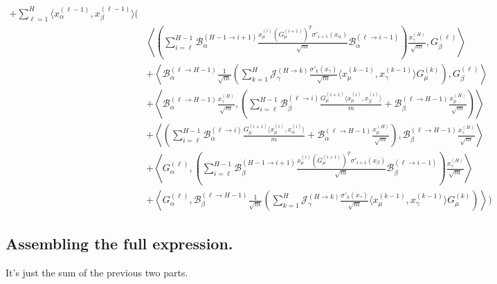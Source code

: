 \documentclass[11pt,a4paper]{article}
\theoremstyle{definition}
\begin{document}
\begin{align}
    + \sum_{\ell=1}^{H} \langle x^{(\ell-1)}_\alpha, x^{(\ell-1)}_\beta \rangle \Biggl( & \nonumber \\
    & \left\langle \left( \sum_{i=\ell}^{H-1} \mathcal{B}^{(H-1 \to i+1)}_\alpha \frac{x^{(i)}_\mu (G^{(i+1)}_\mu)^T \sigma'_{i+1}(x_\alpha)}{\sqrt{m}} \mathcal{B}^{(\ell \to i-1)}_\alpha \right) \frac{x^{(H)}_\gamma}{\sqrt{m}}, G^{(\ell)}_\beta \right\rangle \nonumber \\
    & + \left\langle \mathcal{B}^{(\ell \to H-1)}_{\alpha} \frac{1}{\sqrt{m}}\left( \sum_{k=1}^{H} \mathcal{J}^{(H \to k)}_{\gamma} \frac{\sigma'_{k}(x_\gamma)}{\sqrt{m}} \langle x^{(k-1)}_\mu, x^{(k-1)}_\gamma \rangle G^{(k)}_\mu \right), G^{(\ell)}_\beta \right\rangle \nonumber \\
    & + \left\langle \mathcal{B}^{(\ell \to H-1)}_{\alpha} \frac{x^{(H)}_\gamma}{\sqrt{m}}, \left( \sum_{i=\ell}^{H-1} \mathcal{B}^{(\ell \to i)}_{\beta} \frac{G^{(i+1)}_\mu \langle x^{(i)}_\mu, x^{(i)}_\beta \rangle}{m} + \mathcal{B}^{(\ell \to H-1)}_{\beta} \frac{x^{(H)}_\mu}{\sqrt{m}} \right) \right\rangle \nonumber \\
    & + \left\langle \left( \sum_{i=\ell}^{H-1} \mathcal{B}^{(\ell \to i)}_{\alpha} \frac{G^{(i+1)}_\mu \langle x^{(i)}_\mu, x^{(i)}_\alpha \rangle}{m} + \mathcal{B}^{(\ell \to H-1)}_{\alpha} \frac{x^{(H)}_\mu}{\sqrt{m}} \right), \mathcal{B}^{(\ell \to H-1)}_{\beta} \frac{x^{(H)}_\gamma}{\sqrt{m}} \right\rangle \nonumber \\
    & + \left\langle G^{(\ell)}_\alpha, \left( \sum_{i=\ell}^{H-1} \mathcal{B}^{(H-1 \to i+1)}_\beta \frac{x^{(i)}_\mu (G^{(i+1)}_\mu)^T \sigma'_{i+1}(x_\beta)}{\sqrt{m}} \mathcal{B}^{(\ell \to i-1)}_\beta \right) \frac{x^{(H)}_\gamma}{\sqrt{m}} \right\rangle \nonumber \\
    & + \left\langle G^{(\ell)}_\alpha, \mathcal{B}^{(\ell \to H-1)}_{\beta} \frac{1}{\sqrt{m}}\left( \sum_{k=1}^{H} \mathcal{J}^{(H \to k)}_{\gamma} \frac{\sigma'_{k}(x_\gamma)}{\sqrt{m}} \langle x^{(k-1)}_\mu, x^{(k-1)}_\gamma \rangle G^{(k)}_\mu \right) \right\rangle \Biggr)
    \end{align}
    
    
\subsection{Assembling the full expression.}
It's just the sum of the previous two parts.
\end{document}
